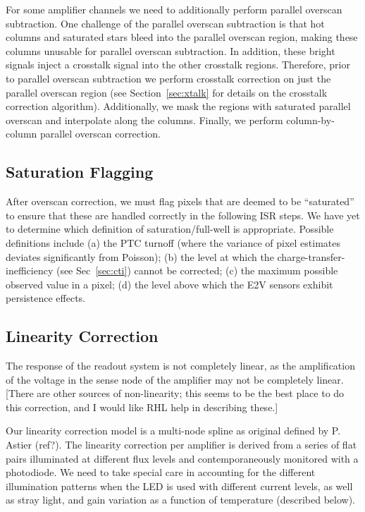 \documentclass[SE,authoryear,lsstdraft,toc]{lsstdoc}
\begin{document}
For some amplifier channels we need to additionally perform parallel overscan
subtraction.  One challenge of the parallel overscan subtraction is that hot
columns and saturated stars bleed into the parallel overscan region, making
these columns unusable for parallel overscan subtraction.  In addition, these
bright signals inject a crosstalk signal into the other crosstalk regions.
Therefore, prior to parallel overscan subtraction we perform crosstalk
correction on just the parallel overscan region (see Section~\ref{sec:xtalk}
for details on the crosstalk correction algorithm).  Additionally, we mask the
regions with saturated parallel overscan and interpolate along the columns.
Finally, we perform column-by-column parallel overscan correction.

\subsection{Saturation Flagging}

After overscan correction, we must flag pixels that are deemed to be
``saturated'' to ensure that these are handled correctly in the following ISR
steps.  We have yet to determine which definition of saturation/full-well is
appropriate.  Possible definitions include (a) the PTC turnoff (where the
variance of pixel estimates deviates significantly from Poisson); (b) the level
at which the charge-transfer-inefficiency (see Sec~\ref{sec:cti}) cannot be
corrected; (c) the maximum possible observed value in a pixel; (d) the level above
which the E2V sensors exhibit persistence effects.

\subsection{Linearity Correction}

The response of the readout system is not completely linear, as the
amplification of the voltage in the sense node of the amplifier may not be
completely linear.  [There are other sources of non-linearity; this seems to be
the best place to do this correction, and I would like RHL help in describing
these.]

Our linearity correction model is a multi-node spline as original defined by
P. Astier (ref?).  The linearity correction per amplifier is derived from a
series of flat pairs illuminated at different flux levels and contemporaneously
monitored with a photodiode.  We need to take special care in accounting for
the different illumination patterns when the LED is used with different current
levels, as well as stray light, and gain variation as a function of temperature
(described below).
\end{document}
